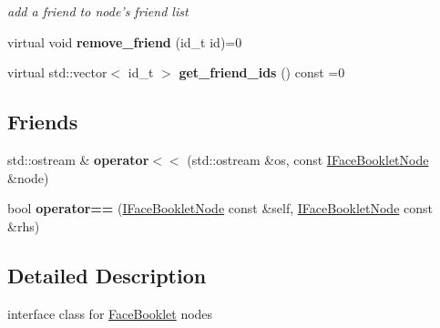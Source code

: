 \begin{DoxyCompactItemize}
\begin{DoxyCompactList}\small\item\em add a friend to node's friend list \end{DoxyCompactList}\item 
\hypertarget{structfb_1_1_i_face_booklet_node_a7cc6a24cc5863b5d095369faa2066042}{virtual void {\bfseries remove\+\_\+friend} (id\+\_\+t id)=0}\label{structfb_1_1_i_face_booklet_node_a7cc6a24cc5863b5d095369faa2066042}

\item 
\hypertarget{structfb_1_1_i_face_booklet_node_a54a83c2e877235c2bf6ed3f66ab52177}{virtual std\+::vector$<$ id\+\_\+t $>$ {\bfseries get\+\_\+friend\+\_\+ids} () const =0}\label{structfb_1_1_i_face_booklet_node_a54a83c2e877235c2bf6ed3f66ab52177}

\end{DoxyCompactItemize}
\subsection*{Friends}
\begin{DoxyCompactItemize}
\item 
\hypertarget{structfb_1_1_i_face_booklet_node_a2dc13e309b0716f9a04cfbdea6d54f95}{std\+::ostream \& {\bfseries operator$<$$<$} (std\+::ostream \&os, const \hyperlink{structfb_1_1_i_face_booklet_node}{I\+Face\+Booklet\+Node} \&node)}\label{structfb_1_1_i_face_booklet_node_a2dc13e309b0716f9a04cfbdea6d54f95}

\item 
\hypertarget{structfb_1_1_i_face_booklet_node_a3483ca80afbc85266b10fa15f0e4f0ed}{bool {\bfseries operator==} (\hyperlink{structfb_1_1_i_face_booklet_node}{I\+Face\+Booklet\+Node} const \&self, \hyperlink{structfb_1_1_i_face_booklet_node}{I\+Face\+Booklet\+Node} const \&rhs)}\label{structfb_1_1_i_face_booklet_node_a3483ca80afbc85266b10fa15f0e4f0ed}

\end{DoxyCompactItemize}


\subsection{Detailed Description}
interface class for \hyperlink{classfb_1_1_face_booklet}{Face\+Booklet} nodes 

